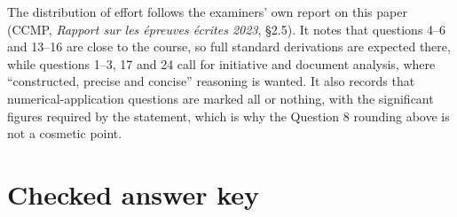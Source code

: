 \documentclass[11pt,a4paper]{article}
\begin{document}
The distribution of effort follows the examiners' own report on this paper
(CCMP, \textit{Rapport sur les épreuves écrites 2023}, \S2.5). It notes that
questions 4--6 and 13--16 are close to the course, so full standard derivations
are expected there, while questions 1--3, 17 and 24 call for initiative and
document analysis, where ``constructed, precise and concise'' reasoning is
wanted. It also records that numerical-application questions are marked all or
nothing, with the significant figures required by the statement, which is why the
Question 8 rounding above is not a cosmetic point.

\section*{Checked answer key}
\end{document}
